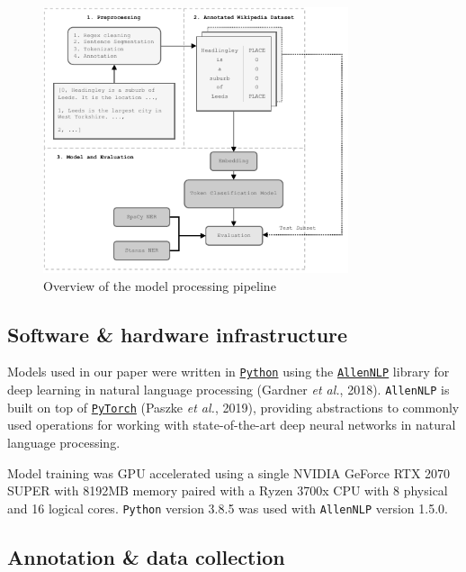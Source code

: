 \documentclass[
  letterpaper,
  11pt,
  english,
  onehalfspacing,
  headsepline]{MastersDoctoralThesis}
\begin{document}
\begin{figure}

{\centering \includegraphics[width=0.8\textwidth,height=\textheight]{03_transformer/./03_figures/figure1.pdf}

}

\caption{\label{fig-workflow}Overview of the model processing pipeline}

\end{figure}

\hypertarget{software-hardware-infrastructure}{%
\subsection{Software \& hardware
infrastructure}\label{software-hardware-infrastructure}}

Models used in our paper were written in
\href{https://www.python.org/}{\texttt{Python}} using the
\href{https://allennlp.org/}{\texttt{AllenNLP}} library for deep
learning in natural language processing (Gardner \emph{et al.}, 2018).
\texttt{AllenNLP} is built on top of
\href{https://pytorch.org}{\texttt{PyTorch}} (Paszke \emph{et al.},
2019), providing abstractions to commonly used operations for working
with state-of-the-art deep neural networks in natural language
processing.

Model training was GPU accelerated using a single NVIDIA GeForce RTX
2070 SUPER with 8192MB memory paired with a Ryzen 3700x CPU with 8
physical and 16 logical cores. \texttt{Python} version 3.8.5 was used
with \texttt{AllenNLP} version 1.5.0.

\hypertarget{annotation-data-collection}{%
\subsection{Annotation \& data
collection}\label{annotation-data-collection}}
\end{document}
